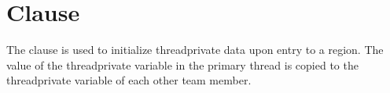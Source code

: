 \pagebreak
\section{ Clause}
\label{sec:copyin}

The  clause is used to initialize threadprivate data upon entry 
to a  region. The value of the threadprivate variable in the primary
thread is copied to the threadprivate variable of each other team member.




